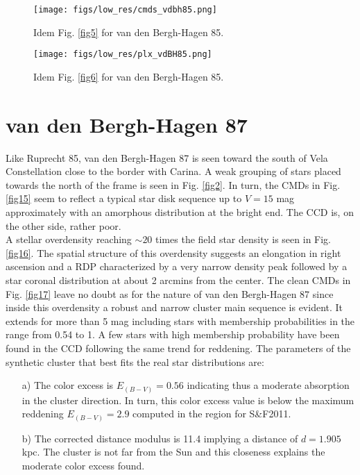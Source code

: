 \documentclass{aa}
\begin{document}
\begin{figure*}[ht]
    \centering
    \texttt{[image: figs/low\_res/cmds\_vdbh85.png]}
    \caption{Idem Fig. \ref{fig5} for van den Bergh-Hagen 85.}
    \label{fig13}
\end{figure*}

\begin{figure*}[ht]
    \centering
    \texttt{[image: figs/low\_res/plx\_vdBH85.png]}
    \caption{Idem Fig. \ref{fig6} for van den Bergh-Hagen 85.}
    \label{fig14}
\end{figure*}



\section{van den Bergh-Hagen 87}

Like Ruprecht 85, van den Bergh-Hagen 87 is seen toward the south of Vela
Constellation close to the border with Carina. A weak grouping of stars placed
towards the north of the frame is seen in Fig. \ref{fig2}. In turn, the CMDs in
Fig. \ref{fig15} seem to reflect a typical star disk sequence up to $V = 15$ mag
approximately with an amorphous distribution at the bright end. The CCD is, on
the other side, rather poor.\\

A stellar overdensity reaching $\sim20$ times the field star density is
seen in Fig. \ref{fig16}. The spatial structure of this overdensity suggests an
elongation in right ascension and a RDP characterized by a very narrow density
peak followed by a star coronal distribution at about 2 arcmins from the center.
The clean CMDs in Fig. \ref{fig17} leave no doubt as for the nature of van den
Bergh-Hagen 87 since inside this overdensity a robust and narrow cluster main
sequence is evident. It extends for more than 5 mag including stars with
membership probabilities in the range from 0.54 to 1. A few stars with high
membership probability have been found in the CCD following the same trend for
reddening. The parameters of the synthetic cluster that best fits the real star
distributions are:

\begin{itemize}
\item [a)] The color excess is $E_{(B-V)} = 0.56$ indicating thus a moderate
    absorption in the cluster direction. In turn, this color excess value is
    below the maximum reddening $E_{(B-V)} = 2.9$ computed in the region for 
    S\&F2011.
\item [b)] The corrected distance modulus is 11.4 implying a distance of $d =
    1.905$ kpc. The cluster is not far from the Sun and this closeness explains
    the moderate color excess found.
\end{itemize}
\end{document}
